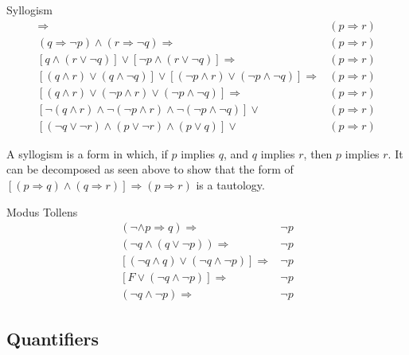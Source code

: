 \documentclass[12pt]{article}
\begin{document}
\begin{definition}{Syllogism}
  \centering
  \begin{align*}
    [(p \Rightarrow q) \land (q \Rightarrow r)]                                            \Rightarrow &(p \Rightarrow r) \\
    (q \Rightarrow \neg p) \land (r \Rightarrow \neg q)                                    \Rightarrow &(p \Rightarrow r) \\
    [q \land (r \lor \neg q)] \lor [\neg p \land (r \lor \neg q)]                          \Rightarrow &(p \Rightarrow r) \\
    [(q \land r) \lor (q \land \neg q)] \lor [(\neg p \land r) \lor (\neg p \land \neg q)] \Rightarrow &(p \Rightarrow r) \\
    [(q \land r) \lor (\neg p \land r) \lor (\neg p \land \neg q)]                         \Rightarrow &(p \Rightarrow r) \\
    [\neg (q \land r) \land \neg (\neg p \land r) \land \neg (\neg p \land \neg q)]        \lor        &(p \Rightarrow r) \\
    [(\neg q \lor \neg r) \land (p \lor \neg r) \land (p \lor q)]                          \lor        &(p \Rightarrow r)
  \end{align*}

  A syllogism is a form in which, if $p$ implies $q$, and $q$ implies $r$, then $p$ implies $r$.
  It can be decomposed as seen above to show that the form of $[(p \Rightarrow q) \land (q \Rightarrow r)] \Rightarrow (p \Rightarrow r)$
  is a tautology.
\end{definition}

\begin{definition}{Modus Tollens}
  \centering
  \begin{align*}
    (\neg \land p \Rightarrow q) \Rightarrow                  &\neg p \\
    (\neg q \land (q \lor \neg p)) \Rightarrow                &\neg p \\
    [(\neg q \land q) \lor (\neg q \land \neg p)] \Rightarrow &\neg p \\
    [F \lor (\neg q \land \neg p)] \Rightarrow                &\neg p \\
    (\neg q \land \neg p) \Rightarrow                         &\neg p
  \end{align*}
\end{definition}

\subsection{Quantifiers}
\label{ssec:quantifiers}
\end{document}
